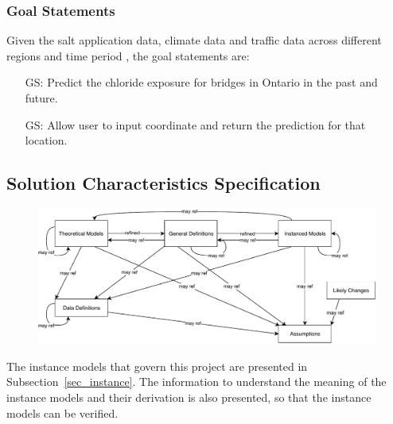 \documentclass[12pt]{article}
\newcounter{goalnum} %
\begin{document}

\newpage
\subsubsection{Goal Statements}

\noindent Given the salt application data, climate data and traffic data across different regions and time period , the goal statements are:

\begin{itemize}

\item[GS\refstepcounter{goalnum}\thegoalnum \label{G_ChlorideExposurePrediction}:] Predict the chloride exposure for bridges in Ontario in the past and future.

\item[GS\refstepcounter{goalnum}\thegoalnum \label{G_ExtractData}:] Allow user to input coordinate and return the prediction for that location.

\end{itemize}

\subsection{Solution Characteristics Specification}

\begin{figure}[H]
  \includegraphics[scale=0.9]{RelationsBetweenTM_GD_IM_DD_A.pdf}
\end{figure}

The instance models that govern this project are presented in
Subsection~\ref{sec_instance}.  The information to understand the meaning of the
instance models and their derivation is also presented, so that the instance
models can be verified.
\end{document}
